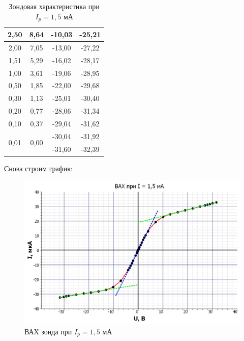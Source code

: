 \documentclass[a4paper,12pt]{article} %
\begin{document}
\begin{table}[h!]
\begin{tabular}{|cc|cc|}
		\multicolumn{1}{|c|}{2,50}                  & 8,64                  & \multicolumn{1}{c|}{-10,03}  & -25,21    \\ \hline
		\multicolumn{1}{|c|}{2,00}                  & 7,05                  & \multicolumn{1}{c|}{-13,00}  & -27,22    \\ \hline
		\multicolumn{1}{|c|}{1,51}                  & 5,29                  & \multicolumn{1}{c|}{-16,02}  & -28,17    \\ \hline
		\multicolumn{1}{|c|}{1,00}                  & 3,61                  & \multicolumn{1}{c|}{-19,06}  & -28,95    \\ \hline
		\multicolumn{1}{|c|}{0,50}                  & 1,85                  & \multicolumn{1}{c|}{-22,00}  & -29,68    \\ \hline
		\multicolumn{1}{|c|}{0,30}                  & 1,13                  & \multicolumn{1}{c|}{-25,01}  & -30,40    \\ \hline
		\multicolumn{1}{|c|}{0,20}                  & 0,77                  & \multicolumn{1}{c|}{-28,06}  & -31,34    \\ \hline
		\multicolumn{1}{|c|}{0,10}                  & 0,37                  & \multicolumn{1}{c|}{-29,04}  & -31,62    \\ \hline
		\multicolumn{1}{|c|}{\multirow{2}{*}{0,01}} & \multirow{2}{*}{0,00} & \multicolumn{1}{c|}{-30,04}  & -31,92    \\ \cline{3-4} 
		\multicolumn{1}{|c|}{}                      &                       & \multicolumn{1}{c|}{-31,60}  & -32,39    \\ \hline
	\end{tabular}
	\caption{Зондовая характеристика при $I_p = 1,5$ мА}
\end{table}


Снова строим график:

\newpage

\begin{figure}[h!]
	\centering
	\includegraphics[scale=0.69]{Pictures/ВАХ_4.jpg}
	\caption{ВАХ зонда при $I_p = 1,5$ мА}
\end{figure}
\end{document}
